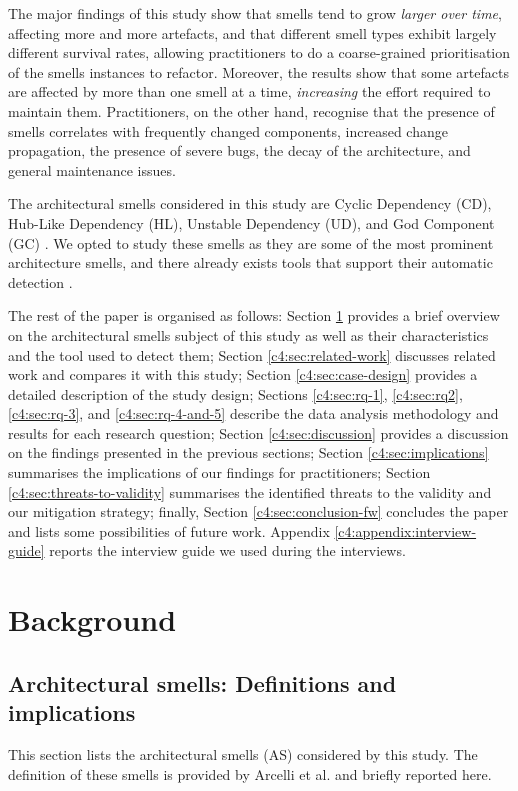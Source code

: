 The major findings of this study show that smells tend to grow \emph{larger over time}, affecting more and more artefacts, and that different smell types exhibit largely different survival rates, allowing practitioners to do a coarse-grained prioritisation of the smells instances to refactor. 
Moreover, the results show that some artefacts are affected by more than one smell at a time, \emph{increasing} the effort required to maintain them.
Practitioners, on the other hand, recognise that the presence of smells correlates with frequently changed components, increased change propagation, the presence of severe bugs, the decay of the architecture, and general maintenance issues.

The architectural smells considered in this study are Cyclic Dependency (CD), Hub-Like Dependency (HL), Unstable Dependency (UD), and God Component (GC) \cite{Arcelli2016,Lippert2006,Sas2019}. We opted to study these smells as they are some of the most prominent architecture smells, and there already exists tools that support their automatic detection \cite{Arcelli2016, Arcelli2017}.

The rest of the paper is organised as follows: Section \ref{c4:sec:background} provides a brief overview on the architectural smells subject of this study as well as their characteristics and the tool used to detect them; Section \ref{c4:sec:related-work} discusses related work and compares it with this study; Section \ref{c4:sec:case-design} provides a detailed description of the study design; Sections \ref{c4:sec:rq-1}, \ref{c4:sec:rq2}, \ref{c4:sec:rq-3}, and \ref{c4:sec:rq-4-and-5} describe the data analysis methodology and results for each research question; Section \ref{c4:sec:discussion} provides a discussion on the findings presented in the previous sections; Section \ref{c4:sec:implications} summarises the implications of our findings for practitioners; Section \ref{c4:sec:threats-to-validity} summarises the identified threats to the validity and our mitigation strategy; finally, Section \ref{c4:sec:conclusion-fw} concludes the paper and lists some possibilities of future work.
Appendix \ref{c4:appendix:interview-guide} reports the interview guide we used during the interviews.

\section{Background}\label{c4:sec:background}
\subsection{Architectural smells: Definitions and implications}\label{c4:sec:arch-smells}
This section lists the architectural smells (AS) considered by this study. The definition of these smells is provided by Arcelli et al. \cite{Arcelli2016} and briefly reported here.

